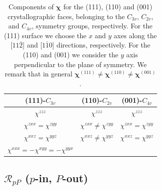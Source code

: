 \begin{table}[b]
\centering
\begin{tabular}{| c | c | c |}
\hline 
(111)-$C_{3v}$     & (110)-$C_{2v}$  & (001)-$C_{4v}$ \\
\hline 
$\chi^{zzz}$ & $\chi^{zzz}$ & $\chi^{zzz}$\\
$\chi^{zxx}=\chi^{zyy}$ & $\chi^{zxx}\ne\chi^{zyy}$ & $\chi^{zxx}=\chi^{zyy}$\\
$\chi^{xxz}=\chi^{yyz}$ & $\chi^{xxz}\ne\chi^{yyz}$ & $\chi^{xxz}=\chi^{yyz}$\\
$\chi^{xxx}=-\chi^{xyy}=-\chi^{yyx}$ & &  \\
\hline 
\end{tabular}
\caption[Nonzero components of $\boldsymbol{\chi}$ for different surface
symmetries.]
{Components of $\boldsymbol{\chi}$ for the (111), (110) and (001)
crystallographic faces, belonging to the $C_{3v}$, $C_{2v}$, and $C_{4v}$,
symmetry groups, respectively. For the (111) surface we choose the $x$ and $y$
axes along the [$11\bar{2}$] and [$1\bar{1}0$] directions, respectively. For the
(110) and (001) we consider the $y$ axis perpendicular to the plane of
symmetry.\cite{sipePRB87} We remark that in general
$\boldsymbol{\chi}^{(111)}\ne \boldsymbol{\chi}^{(110)} \ne
\boldsymbol{\chi}^{(001)}$.}
\label{tab:chis}
\end{table}



\subsection{\texorpdfstring{$\mathcal{R}_{pP}$ ($p$-in, $P$-out)}
{RpP (p-in, P-out)}}
\label{sec:RpP} 

